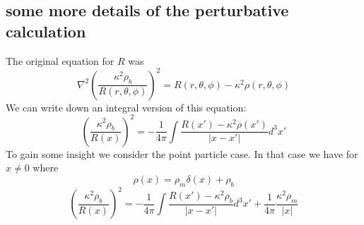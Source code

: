 \documentclass[10pt,a4paper]{report}
\begin{document}
\section{some more details of the perturbative calculation}
The original equation for $R$ was
\begin{equation}
\nabla^2\left(\frac{\kappa^2 \rho_b}{R(r,\theta ,\phi)}\right)^2=R(r,\theta ,\phi)-\kappa^2 \rho (r,\theta ,\phi)
\end{equation}
We can write down an integral version of this equation:
\begin{equation}
\left(\frac{\kappa^2 \rho_b}{R(x)}\right)^2=-\frac{1}{4\pi}\int\frac{R(x')-\kappa^2 \rho (x')}{|x-x'|}d^3x'
\end{equation}
To gain some insight we consider the point particle case. In that case we have for $x\neq 0$ where
\begin{equation}
\rho(x)=\rho_m\delta(x)+\rho_b
\end{equation}
\begin{equation}
\left(\frac{\kappa^2 \rho_b}{R(x)}\right)^2=-\frac{1}{4\pi}\int\frac{R(x')-\kappa^2\rho_b}{|x-x'|}d^3x'+\frac{1}{4\pi}\frac{\kappa^2 \rho_m}{|x|}
\end{equation}
\chapter{}
\end{document}
